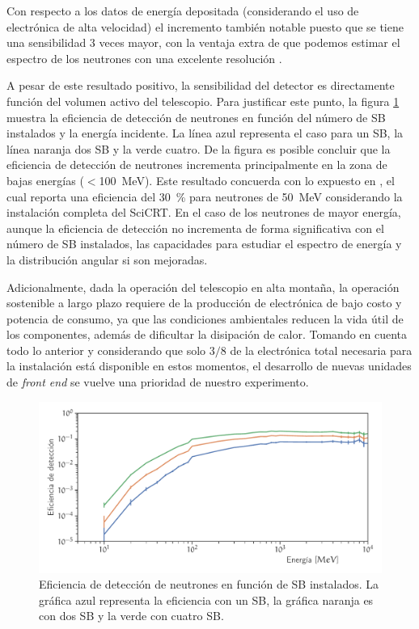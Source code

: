 Con respecto a los datos de energía depositada (considerando el uso de electrónica de alta velocidad) el incremento también notable puesto que se tiene una sensibilidad \num{3} veces mayor, con la ventaja extra de que podemos estimar el espectro de los neutrones con una excelente resolución \cite{ysasai17}.

A pesar de este resultado positivo, la sensibilidad del detector es directamente función del volumen activo del telescopio. Para justificar este punto, la figura \ref{fig:eficiencia-electronica} muestra la eficiencia de detección de neutrones en función del número de SB instalados y la energía incidente. La línea azul representa el caso para un SB, la línea naranja dos SB y la verde cuatro. De la figura es posible concluir que la eficiencia de detección de neutrones incrementa principalmente en la zona de bajas energías ($<$\SI{100}{\mega\electronvolt}). Este resultado concuerda con lo expuesto en \cite{nagaiphd}, el cual reporta una eficiencia del \SI{30}{\percent} para neutrones de \SI{50}{\mega\electronvolt} considerando la instalación completa del SciCRT. En el caso de los neutrones de mayor energía, aunque la eficiencia de detección no incrementa de forma significativa con el número de SB instalados, las capacidades para estudiar el espectro de energía y la distribución angular si son mejoradas.

Adicionalmente, dada la operación del telescopio en alta montaña, la operación sostenible a largo plazo requiere de la producción de electrónica de bajo costo y potencia de consumo, ya que las condiciones ambientales reducen la vida útil de los componentes, además de dificultar la disipación de calor. Tomando en cuenta todo lo anterior y considerando que solo $3/8$ de la electrónica total necesaria para la instalación está disponible en estos momentos, el desarrollo de nuevas unidades de \emph{front end} se vuelve una prioridad de nuestro experimento.

\begin{figure}
        \centering
        \includegraphics[width=\textwidth]{electronics-deff.pdf}
        \caption{Eficiencia de detección de neutrones en función de SB instalados. La gráfica azul representa la eficiencia con un SB, la gráfica naranja es con dos SB y la verde con cuatro SB.}
        \label{fig:eficiencia-electronica}
\end{figure}

